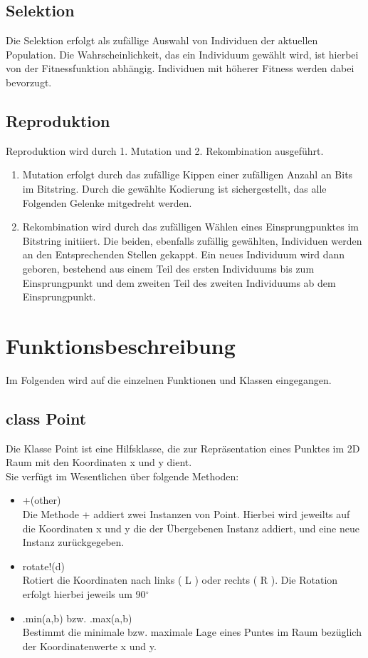 \documentclass[a4paper,10pt,fleqn]{scrartcl}
\begin{document}
\subsection{Selektion}
Die Selektion erfolgt als zufällige Auswahl von Individuen der aktuellen Population. Die Wahrscheinlichkeit, das ein Individuum gewählt wird, ist hierbei von der Fitnessfunktion abhängig. Individuen mit höherer Fitness werden dabei bevorzugt.
\subsection{Reproduktion}
Reproduktion wird durch 1. Mutation und 2. Rekombination ausgeführt.
\begin{enumerate}
\item Mutation erfolgt durch das zufällige Kippen einer zufälligen Anzahl an Bits im Bitstring. Durch die gewählte Kodierung ist sichergestellt, das alle Folgenden Gelenke mitgedreht werden.
\item Rekombination wird durch das zufälligen Wählen eines Einsprungpunktes im Bitstring initiiert. Die beiden, ebenfalls zufällig gewählten, Individuen werden an den Entsprechenden Stellen gekappt. Ein neues Individuum wird dann geboren, bestehend aus einem Teil des ersten Individuums bis zum Einsprungpunkt und dem zweiten Teil des zweiten Individuums ab dem Einsprungpunkt.
\end{enumerate}
\newpage
\section{Funktionsbeschreibung}

Im Folgenden wird auf die einzelnen Funktionen und Klassen eingegangen.
\subsection{class Point}
Die Klasse Point ist eine Hilfsklasse, die zur Repräsentation eines Punktes im 2D Raum mit den Koordinaten x und y dient.\\
Sie verfügt im Wesentlichen über folgende Methoden:
\begin{itemize}
\item +(other)\\
Die Methode + addiert zwei Instanzen von Point. Hierbei wird jeweilts auf die Koordinaten x und y die der Übergebenen Instanz addiert, und eine neue Instanz zurückgegeben.
\item rotate!(d)\\
Rotiert die Koordinaten nach links ( L ) oder rechts ( R ). Die Rotation erfolgt hierbei jeweils um 90$^\circ$
\item .min(a,b) bzw. .max(a,b)\\
Bestimmt die minimale bzw. maximale Lage eines Puntes im Raum bezüglich der Koordinatenwerte x und y.
\end{itemize}
\end{document}

